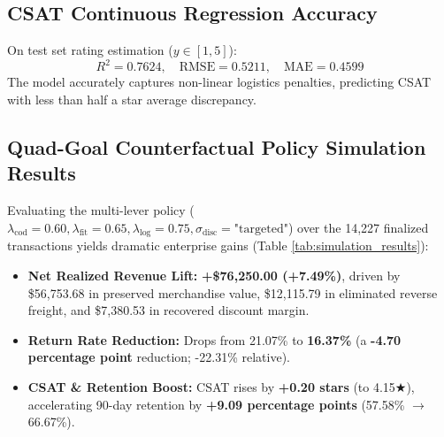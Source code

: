 \documentclass[conference]{IEEEtran}
\begin{document}
\subsection{CSAT Continuous Regression Accuracy}
On test set rating estimation ($y \in [1, 5]$):
\begin{equation}
R^2 = 0.7624, \quad \text{RMSE} = 0.5211, \quad \text{MAE} = 0.4599
\end{equation}
The model accurately captures non-linear logistics penalties, predicting CSAT with less than half a star average discrepancy.

\subsection{Quad-Goal Counterfactual Policy Simulation Results}
Evaluating the multi-lever policy ($\lambda_{\text{cod}}=0.60, \lambda_{\text{fit}}=0.65, \lambda_{\text{log}}=0.75, \sigma_{\text{disc}}=\text{"targeted"}$) over the 14,227 finalized transactions yields dramatic enterprise gains (Table \ref{tab:simulation_results}):
\begin{itemize}
    \item \textbf{Net Realized Revenue Lift:} \textbf{+\$76,250.00 (+7.49\%)}, driven by \$56,753.68 in preserved merchandise value, \$12,115.79 in eliminated reverse freight, and \$7,380.53 in recovered discount margin.
    \item \textbf{Return Rate Reduction:} Drops from 21.07\% to \textbf{16.37\%} (a \textbf{-4.70 percentage point} reduction; -22.31\% relative).
    \item \textbf{CSAT \& Retention Boost:} CSAT rises by \textbf{+0.20 stars} (to 4.15★), accelerating 90-day retention by \textbf{+9.09 percentage points} (57.58\% $\to$ 66.67\%).
\end{itemize}
\end{document}
